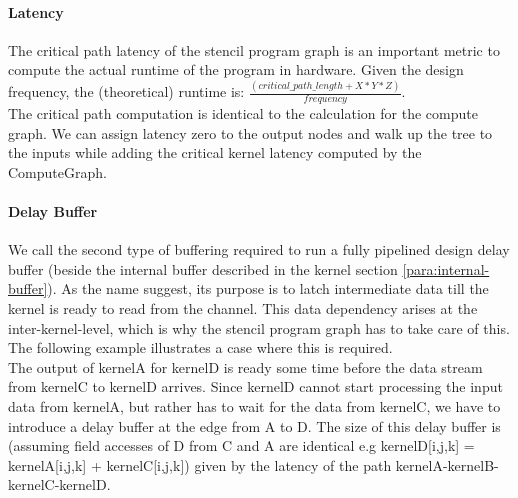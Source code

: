 \paragraph{Latency}
The critical path latency of the stencil program graph is an important metric to compute the actual runtime of the program in hardware. Given the design frequency, the (theoretical) runtime is: $\frac{(critical\_path\_length + X*Y*Z)}{frequency}$. \\
The critical path computation is identical to the calculation for the compute graph. We can assign latency zero to the output nodes and walk up the tree to the inputs while adding the critical kernel latency computed by the ComputeGraph.



\paragraph{Delay Buffer}
We call the second type of buffering required to run a fully pipelined design delay buffer (beside the internal buffer described in the kernel section \ref{para:internal-buffer}). As the name suggest, its purpose is to latch intermediate data till the kernel is ready to read from the channel. This data dependency arises at the inter-kernel-level, which is why the stencil program graph has to take care of this. The following example illustrates a case where this is required.\\
The output of kernelA for kernelD is ready some time before the data stream from kernelC to kernelD arrives. Since kernelD cannot start processing the input data from kernelA, but rather has to wait for the data from kernelC, we have to introduce a delay buffer at the edge from A to D. The size of this delay buffer is (assuming field accesses of D from C and A are identical e.g kernelD[i,j,k] = kernelA[i,j,k] + kernelC[i,j,k]) given by the latency of the path kernelA-kernelB-kernelC-kernelD.   
